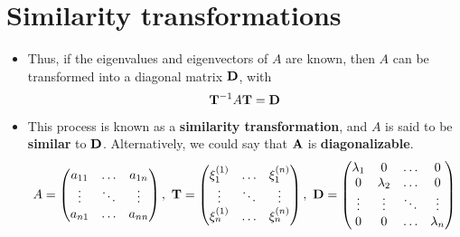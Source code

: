 \documentclass[11pt,a4paper]{article}
\begin{document}
	\section*{Similarity transformations}
	\begin{itemize}
		\item Thus, if the eigenvalues and eigenvectors of $A$ are known, then $A$ can be transformed into a diagonal matrix $\vb{D}$, with
		$$
		\vb{T}^{-1}A\vb{T} = \vb{D}
		$$
		\item This process is known as a \textbf{similarity transformation}, and $A$ is said to be \textbf{similar} to $\vb{D}$. Alternatively, we could say that $\vb{A}$ is \textbf{diagonalizable}.
		$$
		A =
		\begin{pmatrix}
			a_{11} & \ldots & a_{1n}\\
			\vdots & \ddots & \vdots\\
			a_{n1} & \ldots & a_{nn}
		\end{pmatrix},\ 
		\vb{T}=
		\begin{pmatrix}
			\xi_1^{(1)} & \ldots & \xi_1^{(n)}\\
			\vdots & \ddots & \vdots\\
			\xi_n^{(1)} & \ldots & \xi_n^{(n)}
		\end{pmatrix},\ 
		\vb{D} =
		\begin{pmatrix}
			\lambda_1 & 0 & \ldots & 0\\
			0 & \lambda_2 & \ldots & 0\\
			\vdots & \vdots & \ddots & \vdots\\
			0 & 0 & \ldots & \lambda_n
		\end{pmatrix}
		$$
	\end{itemize}
\end{document}
